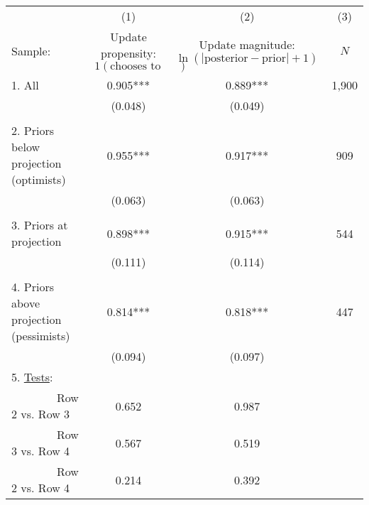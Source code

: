 \begin{tabular}{l c c c}
  \hline
  \hline
 & (1) & (2) & (3) \\ 
  Sample: & \shortstack{Update propensity: \\
  $1(\text{chooses to update})$} & \shortstack{Update magnitude: \\ $\ln(|\text{posterior} -
  \text{prior}|+1)$} & $N$ \\ 
  \hline  
1. All & 0.905*** & 0.889*** & 1,900 \\
  & (0.048) & (0.049) \\
  \\
2. Priors below projection (optimists) & 0.955***
       & 0.917*** & 
 909 \\
  & (0.063) & (0.063) \\
  \\
3. Priors at projection & 0.898*** & 0.915***
          & 544 \\
  & (0.111) & (0.114) \\
  \\
4. Priors above projection (pessimists) & 0.814*** & 0.818***
          & 447 \\
  & (0.094) & (0.097) \\
  \hline
  5. \ul{Tests}: \\
  \ \ \ \ \ \ \ \   Row 2 vs. Row 3 & 0.652
       & 0.987 \\  
  \ \ \ \ \ \ \ \   Row 3 vs. Row 4 & 0.567 
             & 0.519 \\ 
  \ \ \ \ \ \ \ \  Row 2 vs. Row 4 & 0.214 & 0.392 \\   
  \hline   
  \hline 
\end{tabular}

